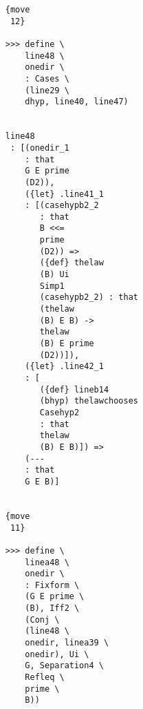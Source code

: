 \documentclass[12pt]{article}
\begin{document}
\begin{verbatim}
                                    {move 
                                     12}

                                    >>> define \
                                        line48 \
                                        onedir \
                                        : Cases \
                                        (line29 \
                                        dhyp, line40, line47)


                                    line48 
                                     : [(onedir_1 
                                        : that 
                                        G E prime 
                                        (D2)), 
                                        ({let} .line41_1 
                                        : [(casehypb2_2 
                                           : that 
                                           B <<= 
                                           prime 
                                           (D2)) => 
                                           ({def} thelaw 
                                           (B) Ui 
                                           Simp1 
                                           (casehypb2_2) : that 
                                           (thelaw 
                                           (B) E B) -> 
                                           thelaw 
                                           (B) E prime 
                                           (D2))]), 
                                        ({let} .line42_1 
                                        : [
                                           ({def} lineb14 
                                           (bhyp) thelawchooses 
                                           Casehyp2 
                                           : that 
                                           thelaw 
                                           (B) E B)]) => 
                                        (--- 
                                        : that 
                                        G E B)]


                                    {move 
                                     11}

                                    >>> define \
                                        linea48 \
                                        onedir \
                                        : Fixform \
                                        (G E prime \
                                        (B), Iff2 \
                                        (Conj \
                                        (line48 \
                                        onedir, linea39 \
                                        onedir), Ui \
                                        G, Separation4 \
                                        Refleq \
                                        prime \
                                        B))



\end{verbatim}
\end{document}
